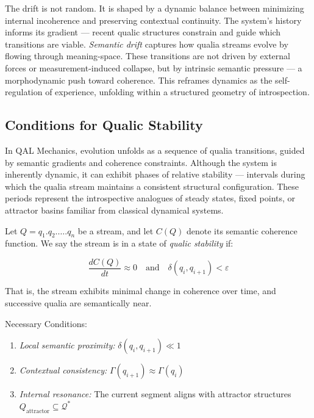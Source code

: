 \documentclass[11pt]{article}
\numberwithin{equation}{section} %
\begin{document}
The drift is not random. It is shaped by a dynamic balance between minimizing internal incoherence and preserving contextual continuity. The system’s history informs its gradient — recent qualic structures constrain and guide which transitions are viable. \textit{Semantic drift} captures how qualia streams evolve by flowing through meaning-space. These transitions are not driven by external forces or measurement-induced collapse, but by intrinsic semantic pressure — a morphodynamic push toward coherence. This reframes dynamics as the self-regulation of experience, unfolding within a structured geometry of introspection.

\subsection{Conditions for Qualic Stability}

In QAL Mechanics, evolution unfolds as a sequence of qualia transitions, guided by semantic gradients and coherence constraints. Although the system is inherently dynamic, it can exhibit phases of relative stability — intervals during which the qualia stream maintains a consistent structural configuration. These periods represent the introspective analogues of steady states, fixed points, or attractor basins familiar from classical dynamical systems.

\bigskip

Let \( Q = q_1 . q_2 . \dots . q_n \) be a stream, and let \( C(Q) \) denote its semantic coherence function. We say the stream is in a state of \textit{qualic stability} if:

\begin{equation}
\frac{dC(Q)}{dt} \approx 0 \quad \text{and} \quad \delta(q_i, q_{i+1}) < \varepsilon
\end{equation}

That is, the stream exhibits minimal change in coherence over time, and successive qualia are semantically near.

\bigskip

Necessary Conditions:
\begin{enumerate}
  \item \textit{Local semantic proximity:} \( \delta(q_i, q_{i+1}) \ll 1 \)
  \item \textit{Contextual consistency:} \( \Gamma(q_{i+1}) \approx \Gamma(q_i) \)
  \item \textit{Internal resonance:} The current segment aligns with attractor structures \( Q_{\text{attractor}} \subseteq \mathcal{Q}^* \)
\end{enumerate}
\end{document}
